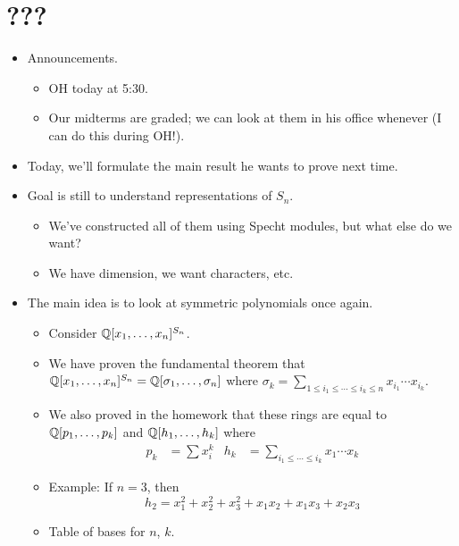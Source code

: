 \documentclass[../notes.tex]{subfiles}
\begin{document}
\section{???}
\begin{itemize}
    \item {}Announcements.
    \begin{itemize}
        \item OH today at 5:30.
        \item Our midterms are graded; we can look at them in his office whenever (I can do this during OH!).
    \end{itemize}
    \item Today, we'll formulate the main result he wants to prove next time.
    \item Goal is still to understand representations of $S_n$.
    \begin{itemize}
        \item We've constructed all of them using Specht modules, but what else do we want?
        \item We have dimension, we want characters, etc.
    \end{itemize}
    \item The main idea is to look at symmetric polynomials once again.
    \begin{itemize}
        \item Consider $\mathbb{Q}[x_1,\dots,x_n]^{S_n}$.
        \item We have proven the fundamental theorem that $\mathbb{Q}[x_1,\dots,x_n]^{S_n}=\mathbb{Q}[\sigma_1,\dots,\sigma_n]$ where $\sigma_k=\sum_{1\leq i_1\leq\cdots\leq i_k\leq n}x_{i_1}\cdots x_{i_k}$.
        \item We also proved in the homework that these rings are equal to $\mathbb{Q}[p_1,\dots,p_k]$ and $\mathbb{Q}[h_1,\dots,h_k]$ where
        \begin{align*}
            p_k &= \sum x_i^k&
            h_k &= \sum_{i_1\leq\cdots\leq i_k}x_1\cdots x_k
        \end{align*}
        \item Example: If $n=3$, then
        \begin{equation*}
            h_2 = x_1^2+x_2^2+x_3^2+x_1x_2+x_1x_3+x_2x_3
        \end{equation*}
        \item Table of bases for $n$, $k$.
        \begin{table}[h!]
            \centering
            \begin{tabular}{c|c|c|c|c}

\end{tabular}
\end{table}
\end{itemize}
\end{itemize}
\end{document}
